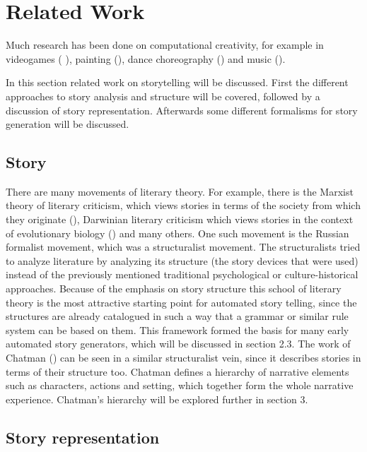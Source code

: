 \section{Related Work}

Much research has been done on computational creativity, for example in
videogames (\cite{liapis2014computational} \cite{crawford1998computer}), painting
(\cite{colton2015painting}), dance choreography (\cite{carlson2011scuddle}) and
music (\cite{johnson2014musical}).

In this section related work on storytelling will be discussed. First the 
different approaches
to story analysis and structure will be covered, followed by a discussion of story
representation. Afterwards some different formalisms for story generation will be
discussed.

\subsection{Story}

There are many movements of literary theory.
For example, there is the Marxist theory of literary criticism, which views
stories in terms of the society from which they originate
(\cite{eagleton2002marxism}), Darwinian literary criticism which views stories
in the context of evolutionary biology (\cite{carroll2004literary}) and many others.
One such movement is the Russian
formalist movement, which was a structuralist movement. The structuralists
tried to analyze literature by analyzing its structure (the story
devices that were used) instead of the previously mentioned traditional 
psychological or
culture-historical approaches. Because of the emphasis on story structure this
school of literary theory is the most attractive starting point for automated story telling, since
the structures are already catalogued in such a way that a grammar or similar
rule system can be based on them. This framework formed the basis for many early
automated story generators, which will be discussed in section 2.3.
The work of Chatman (\cite{chatman1980story})
can be seen in a similar structuralist vein, since it describes stories in terms
of their structure too. Chatman defines a hierarchy of narrative elements such
as characters, actions and setting, which together form the whole narrative
experience. Chatman's hierarchy will be explored further in section 3.

\subsection{Story representation}

